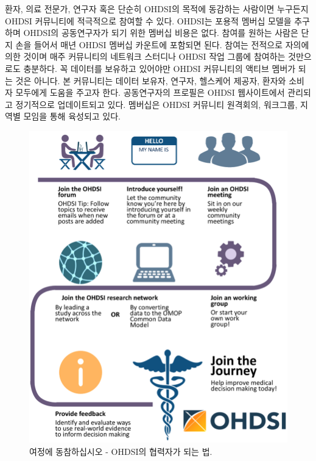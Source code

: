 \documentclass[11pt]{book}
\theoremstyle{definition}
\theoremstyle{definition}
\theoremstyle{definition}
\theoremstyle{remark}
\begin{document}
환자, 의료 전문가, 연구자 혹은 단순히 OHDSI의 목적에 동감하는 사람이면
누구든지 OHDSI 커뮤니티에 적극적으로 참여할 수 있다. OHDSI는 포용적
멤버십 모델을 추구하며 OHDSI의 공동연구자가 되기 위한 멤버십 비용은
없다. 참여를 원하는 사람은 단지 손을 들어서 매년 OHDSI 멤버십 카운트에
포함되면 된다. 참여는 전적으로 자의에 의한 것이며 매주 커뮤니티의
네트워크 스터디나 OHDSI 작업 그룹에 참여하는 것만으로도 충분하다. 꼭
데이터를 보유하고 있어야만 OHDSI 커뮤니티의 액티브 멤버가 되는 것은
아니다. 본 커뮤니티는 데이터 보유자, 연구자, 헬스케어 제공자, 환자와
소비자 모두에게 도움을 주고자 한다. 공동연구자의 프로필은 OHDSI
웹사이트에서 관리되고 정기적으로 업데이트되고 있다. 멤버십은 OHDSI
커뮤니티 원격회의, 워크그룹, 지역별 모임을 통해 육성되고 있다.
  

\begin{figure}

{\centering \includegraphics[width=0.9\linewidth]{images/WhereToBegin/joinTheJourney} 

}

\caption{여정에 동참하십시오 - OHDSI의 협력자가 되는 법.}\label{fig:jointhejourney}
\end{figure}
\end{document}
